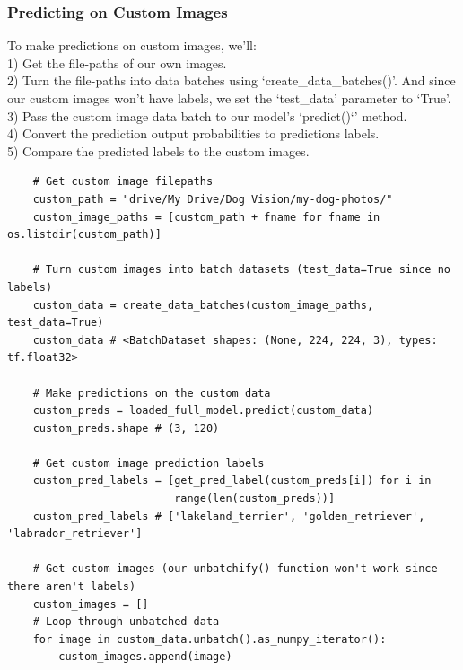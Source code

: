 \documentclass[11pt, a4paper]{article}
\begin{document}
\begin{spacing}{1.1}
	\subsubsection{Predicting on Custom Images}
	To make predictions on custom images, we'll: \vspace*{1mm} \\
	\hspace*{2mm} 1) Get the file-paths of our own images. \\
	\hspace*{2mm} 2) Turn the file-paths into data batches using `create\_data\_batches()'. And since our custom images \hspace*{7mm} won't have labels, we set the `test\_data' parameter to `True'. \\
	\hspace*{2mm} 3) Pass the custom image data batch to our model's `predict()`' method. \\
	\hspace*{2mm} 4) Convert the prediction output probabilities to predictions labels. \\
	\hspace*{2mm} 5) Compare the predicted labels to the custom images.
	\begin{lstlisting}
	# Get custom image filepaths
	custom_path = "drive/My Drive/Dog Vision/my-dog-photos/"
	custom_image_paths = [custom_path + fname for fname in os.listdir(custom_path)]
	
	# Turn custom images into batch datasets (test_data=True since no labels)
	custom_data = create_data_batches(custom_image_paths, test_data=True)
	custom_data # <BatchDataset shapes: (None, 224, 224, 3), types: tf.float32>
	
	# Make predictions on the custom data
	custom_preds = loaded_full_model.predict(custom_data)
	custom_preds.shape # (3, 120)
	
	# Get custom image prediction labels
	custom_pred_labels = [get_pred_label(custom_preds[i]) for i in 
	                      range(len(custom_preds))]
	custom_pred_labels # ['lakeland_terrier', 'golden_retriever', 'labrador_retriever']
	
	# Get custom images (our unbatchify() function won't work since there aren't labels)
	custom_images = []
	# Loop through unbatched data
	for image in custom_data.unbatch().as_numpy_iterator():
		custom_images.append(image)
	

\end{lstlisting}
\end{spacing}
\end{document}
